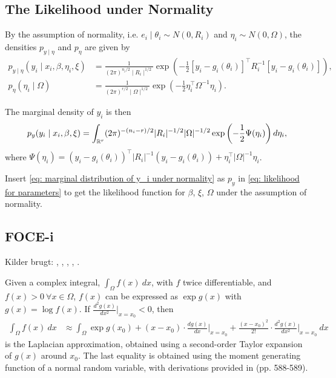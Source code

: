 \subsection{The Likelihood under Normality}
By the assumption of normality, i.e. $e_i\mid \theta_i \sim N(0,R_i)$ and $\eta_i \sim N(0,\Omega)$, the densities $p_{y\mid \eta}$ and $p_{\eta}$ are given by
\begin{align*}
    p_{y\mid \eta}(y_i\mid x_i,\beta,\eta_i,\xi) &= \frac{1}{(2\pi)^{n_i/2}\mid R_i\mid ^{1/2}}\exp{\left(-\frac{1}{2}\left[y_i-g_i(\theta_i)\right]^\top R_i^{-1}\left[y_i-g_i(\theta_i)\right]\right)},\\
    p_\eta(\eta_i\mid \Omega)&=\frac{1}{(2\pi)^{r/2}\mid \Omega\mid ^{1/2}}\exp{\left(-\frac{1}{2}\eta_i^\top \Omega^{-1}\eta_i\right)}.
\end{align*}

The marginal density of $y_i$ is then
\begin{align}
    p_y(y_i\mid x_i,\beta,\xi)=\int_{\mathbb{R}^r}(2\pi)^{-(n_i-r)/2}|R_i|^{-1/2}|\Omega|^{-1/2}\exp{\left(-\frac{1}{2}\Psi(\eta_i)\right)d\eta_i}, \label{eq: marginal distribution of y_i under normality}
\end{align}
where $\Psi(\eta_i)=\left(y_i-g_i(\theta_i)\right)^\top|R_i|^{-1}\left(y_i-g_i(\theta_i)\right)+\eta_i^\top|\Omega|^{-1}\eta_i$. 

Insert \eqref{eq: marginal distribution of y_i under normality} as $p_y$ in \eqref{eq: likelihood for parameters} to get the likelihood function for $\beta$, $\xi$, $\Omega$ under the assumption of normality.

\subsection{FOCE-i}
Kilder brugt: \cite{Almquist2015}, \cite{Bae2016}, \cite{Savic2009}, \cite{Wang2007}, \cite{Davidian1995}.

Given a complex integral, $ \int_\Omega f(x) \ dx$, with $f$ twice differentiable, and $f(x)>0 \ \forall x \in \Omega$, $f(x)$ can be expressed as $\exp g(x)$ with $g(x)=\log f(x)$. If $\frac{d^2 g(x)}{d x^2}\big\rvert_{x=x_0}<0$, then
\begin{align*}
    \int_\Omega f(x) \ dx &\approx \int_\Omega \exp g(x_0) +(x-x_0) \cdot\frac{d g(x)}{d x}\Big\rvert_{x=x_0} +\frac{(x-x_0)^2}{2!} \cdot \frac{d^2 g(x)}{d x^2}\Big\rvert_{x=x_0}\ dx
\end{align*}
is the Laplacian approximation, obtained using a second-order Taylor expansion of $g(x)$ around $x_0$. The last equality is obtained using the moment generating function of a normal random variable, with derivations provided in \cite{Wang2007} (pp. 588-589).

